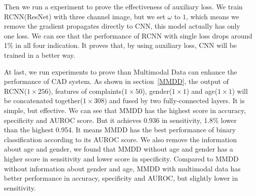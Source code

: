 \documentclass[runningheads]{llncs}
\begin{document}
Then we run a experiment to prove the effectiveness of auxiliary loss. We train RCNN(ResNet) with three channel image, but we set $\omega$ to $1$, which means we remove the gradient propagates directly to CNN, this model actually has only one loss. We can see that the performance of RCNN with single loss drops around 1\% in all four indication. It proves that, by using auxiliary loss, CNN will be trained in a better way. 

At last, we run experiments to prove than Multimodal Data can enhance the performance of CAD system. As shown in section~\ref{MMDD}, the output of RCNN($1 \times 256$), features of complaints($1 \times 50$), gender($1 \times 1$) and age($1 \times 1$) will be concatenated together($1 \times 308$) and fused by two fully-connected layers. It is simple, but effective. We can see that MMDD has the highest score in accuracy, specificity and AUROC score. But it achieves 0.936 in sensitivity, 1.8\% lower than the highest 0.954. It means MMDD has the best performance of binary classification according to its AUROC score. We also remove the information about age and gender, we found that MMDD without age and gender has a higher score in sensitivity and lower score in specificity. Compared to MMDD without information about gender and age, MMDD with multimodal data has better performance in accuracy, specificity and AUROC, but slightly lower in sensitivity. 
\end{document}
